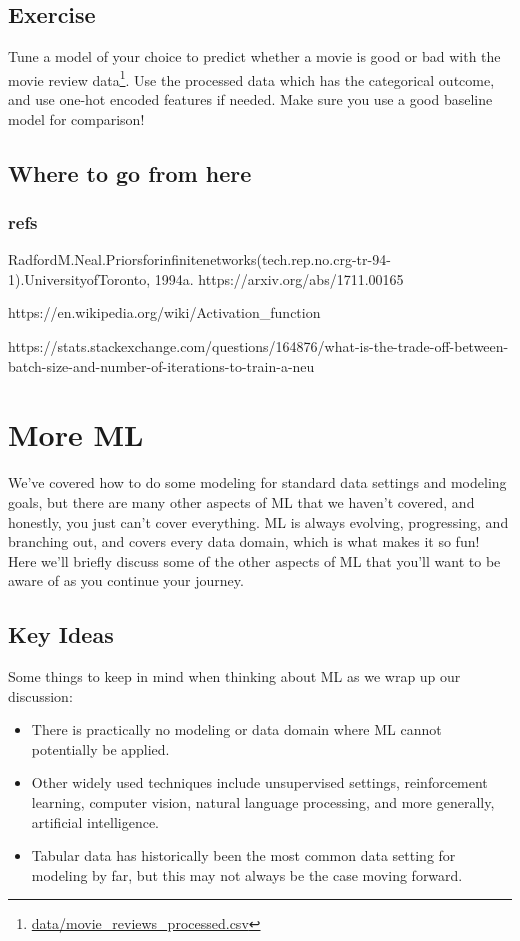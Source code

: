\documentclass[
  letterpaper,
]{krantz}
\providecommand{\tightlist}{%
  \setlength{\itemsep}{0pt}\setlength{\parskip}{0pt}}\usepackage{longtable,booktabs,array}
\DeclareRobustCommand{\href}[2]{#2\footnote{\url{#1}}}
\begin{document}
\section{Exercise}\label{exercise-1}

Tune a model of your choice to predict whether a movie is good or bad
with the \href{data/movie_reviews_processed.csv}{movie review data}. Use
the processed data which has the categorical outcome, and use one-hot
encoded features if needed. Make sure you use a good baseline model for
comparison!

\section{Where to go from here}\label{where-to-go-from-here-1}

\subsection{refs}\label{refs-2}

RadfordM.Neal.Priorsforinfinitenetworks(tech.rep.no.crg-tr-94-1).UniversityofToronto,
1994a. https://arxiv.org/abs/1711.00165

https://en.wikipedia.org/wiki/Activation\_function

https://stats.stackexchange.com/questions/164876/what-is-the-trade-off-between-batch-size-and-number-of-iterations-to-train-a-neu

\chapter{More ML}\label{more-ml}

We've covered how to do some modeling for standard data settings and
modeling goals, but there are many other aspects of ML that we haven't
covered, and honestly, you just can't cover everything. ML is always
evolving, progressing, and branching out, and covers every data domain,
which is what makes it so fun! Here we'll briefly discuss some of the
other aspects of ML that you'll want to be aware of as you continue your
journey.

\section{Key Ideas}\label{key-ideas-3}

Some things to keep in mind when thinking about ML as we wrap up our
discussion:

\begin{itemize}
\tightlist
\item
  There is practically no modeling or data domain where ML cannot
  potentially be applied.
\item
  Other widely used techniques include unsupervised settings,
  reinforcement learning, computer vision, natural language processing,
  and more generally, artificial intelligence.
\item
  Tabular data has historically been the most common data setting for
  modeling by far, but this may not always be the case moving forward.
\end{itemize}
\end{document}
